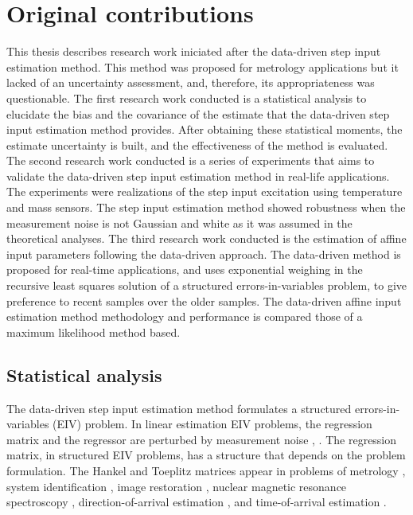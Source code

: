 \section{Original contributions}


This thesis describes research work iniciated after the data-driven step input estimation method.
This method was proposed for metrology applications but it lacked of an uncertainty assessment, and, therefore, its appropriateness was questionable.
The first research work conducted is a statistical analysis to elucidate the bias and the covariance of the estimate that the data-driven step input estimation method provides.
After obtaining these statistical moments, the estimate uncertainty is built, and the effectiveness of the method is evaluated.
The second research work conducted is a series of experiments that aims to validate the data-driven step input estimation method in real-life applications.
The experiments were realizations of the step input excitation using temperature and mass sensors.
The step input estimation method showed robustness when the measurement noise is not Gaussian and white as it was assumed in the theoretical analyses.
The third research work conducted is the estimation of affine input parameters following the data-driven approach. 
The data-driven method is proposed for real-time applications, and uses exponential weighing in the recursive least squares solution of a structured errors-in-variables problem, to give preference to recent samples over the older samples.
The data-driven affine input estimation method methodology and performance is compared those of a maximum likelihood method based.

\subsection{Statistical analysis}

The data-driven step input estimation method formulates a structured errors-in-variables (EIV) problem.
In linear estimation EIV problems, the regression matrix and the regressor are perturbed by measurement noise \citep{VanHuffel91Book}, \citep{Markovsky07overview}.
The regression matrix, in structured EIV problems, has a structure that depends on the problem formulation.
The Hankel and Toeplitz matrices appear in problems of metrology \citep{Markovsky15cep}, system identification \citep{Soderstrom07}, image restoration \citep{Feiz17}, nuclear magnetic resonance spectroscopy \citep{Cai16}, direction-of-arrival estimation \citep{Pan18}, and time-of-arrival estimation \citep{Jia18}.

